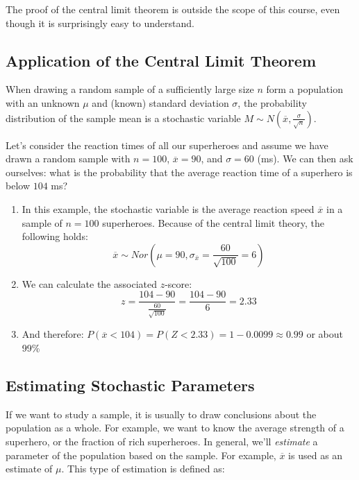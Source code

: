 The proof of the central limit theorem is outside the scope of this course, even though it is surprisingly easy to understand.

\subsection{Application of the Central Limit Theorem}
When drawing a random sample of a sufficiently large size $n$ form a population with an unknown $\mu$ and (known) standard deviation $\sigma$, the probability distribution of the sample mean is a stochastic variable $M \sim N (\overline{x}, \frac{\sigma}{\sqrt{n}})$.

\begin{example}
  Let's consider the reaction times of all our superheroes and assume we have drawn a random sample with $n = 100$, $\overline{x} = 90$, and $\sigma = 60$ (ms).
  We can then ask ourselves: what is the probability that the average reaction time of a superhero is below $104$ ms?

  \begin{enumerate}
    \item In this example, the stochastic variable is the average reaction speed $\overline{x}$ in a sample of $n=100$ superheroes. Because of the central limit theory, the following holds:
    \[ \overline{x} \sim Nor(\mu = 90, \sigma_{\overline{x}} = \frac{60}{\sqrt{100}} = 6) \]
    \item We can calculate the associated $z$-score:
    \[ z = \frac{104-90}{\frac{60}{\sqrt{100}}} = \frac{104-90}{6} = 2.33 \]
    \item And therefore: $P(\overline{x} < 104) = P(Z < 2.33) = 1 - 0.0099 \approx 0.99$ or about 99\%
  \end{enumerate}
\end{example}

\subsection{Estimating Stochastic Parameters}
\label{ssec:estimating-stochastic-parameters}

If we want to study a sample, it is usually to draw conclusions about the population as a whole. 
For example, we want to know the average strength of a superhero, or the fraction of rich superheroes. 
In general, we'll \emph{estimate} a parameter of the population based on the sample. For example, $\overline{x}$ is used as an estimate of $\mu$. This type of estimation is defined as:

